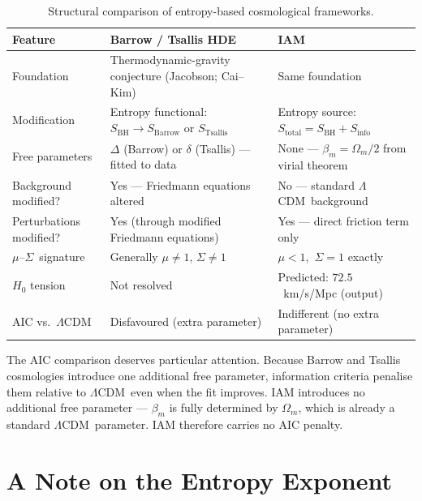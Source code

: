\documentclass[12pt]{article}
\newcommand{\Oms}{\Omega_m}
\newcommand{\bm}{\beta_m}
\newcommand{\Sbh}{S_\mathrm{BH}}
\newcommand{\Sinfo}{S_\mathrm{info}}
\newcommand{\Stot}{S_\mathrm{total}}
\newcommand{\LCDM}{$\Lambda$CDM}
\newcommand{\musig}{$\mu$--$\Sigma$}
\begin{document}
\begin{table}[h]
  \centering
  \caption{Structural comparison of entropy-based cosmological frameworks.}
  \label{tab:compare}
  \renewcommand{\arraystretch}{1.35}
  \begin{tabular}{>{\raggedright}p{3.2cm}
                  >{\raggedright}p{4.8cm}
                  >{\raggedright\arraybackslash}p{5.0cm}}
    \toprule
    \textbf{Feature}
      & \textbf{Barrow / Tsallis HDE}
      & \textbf{IAM} \\
    \midrule
    Foundation
      & Thermodynamic-gravity conjecture (Jacobson; Cai--Kim)
      & Same foundation \\
    Modification
      & Entropy functional: $\Sbh \to S_\mathrm{Barrow}$ or $S_\mathrm{Tsallis}$
      & Entropy source: $\Stot = \Sbh + \Sinfo$ \\
    Free parameters
      & $\Delta$ (Barrow) or $\delta$ (Tsallis) --- fitted to data
      & None --- $\bm = \Oms/2$ from virial theorem \\
    Background modified?
      & Yes --- Friedmann equations altered
      & No --- standard \LCDM\ background \\
    Perturbations modified?
      & Yes (through modified Friedmann equations)
      & Yes --- direct friction term only \\
    \musig\ signature
      & Generally $\mu\ne1$, $\Sigma\ne1$
      & $\mu < 1$,\ $\Sigma = 1$ exactly \\
    $H_0$ tension
      & Not resolved \citep{Luciano2025}
      & Predicted: $72.5$~km/s/Mpc (output) \\
    AIC vs.\ \LCDM
      & Disfavoured (extra parameter)
      & Indifferent (no extra parameter) \\
    \bottomrule
  \end{tabular}
\end{table}

The AIC comparison deserves particular attention.  Because Barrow and Tsallis
cosmologies introduce one additional free parameter, information criteria penalise
them relative to \LCDM\ even when the fit improves.  IAM introduces no additional
free parameter --- $\bm$ is fully determined by $\Oms$, which is already a
standard \LCDM\ parameter.  IAM therefore carries no AIC penalty.

\section{A Note on the Entropy Exponent}
\end{document}
